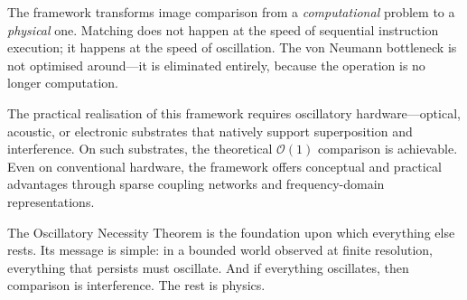 \documentclass[11pt,twocolumn,a4paper]{article}
\newcommand{\BigO}{\mathcal{O}}
\begin{document}
The framework transforms image comparison from a \emph{computational} problem to a \emph{physical} one. Matching does not happen at the speed of sequential instruction execution; it happens at the speed of oscillation. The von Neumann bottleneck is not optimised around---it is eliminated entirely, because the operation is no longer computation.

The practical realisation of this framework requires oscillatory hardware---optical, acoustic, or electronic substrates that natively support superposition and interference. On such substrates, the theoretical $\BigO(1)$ comparison is achievable. Even on conventional hardware, the framework offers conceptual and practical advantages through sparse coupling networks and frequency-domain representations.

The Oscillatory Necessity Theorem is the foundation upon which everything else rests. Its message is simple: in a bounded world observed at finite resolution, everything that persists must oscillate. And if everything oscillates, then comparison is interference. The rest is physics.



\end{document}
